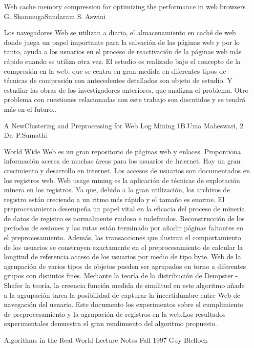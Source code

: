 Web cache memory compression for optimizing the performance in web browsers
G. ShanmugaSundaram
S. Aswini

Los navegadores Web se utilizan a diario, el almacenamiento en caché de web donde juega un papel importante para la salvación de las páginas web y por lo tanto, ayuda a los usuarios en el proceso de reactivación de la páginas web más rápido cuando se utiliza otra vez. El estudio es realizado bajo el concepto de la compresión en la web, que se centra en gran medida en diferentes tipos de técnicas de compresión con antecedentes detallados son objeto de estudio. Y estudiar las obras de los investigadores anteriores, que analizan el problema.  Otro problema con cuestiones relacionadas con este trabajo son discutidos y se tendrá más en el futuro..


A NewClustering and Preprocessing for Web Log Mining
1B.Uma Maheswari, 2 Dr. P.Sumathi

World Wide Web es un gran repositorio de páginas web y enlaces. Proporciona información acerca de muchas áreas para los usuarios de Internet. Hay un gran crecimiento y desarrollo en internet. Los accesos de usuarios  son documentados en los registros web. Web usage mining es la aplicación de técnicas de explotación minera en los registros. Ya que, debido a la gran utilización, los archivos de registro están creciendo a un ritmo más rápido y el tamaño es enorme. El preprocesamiento desempeña un papel vital en la eficacia del proceso de minería de datos de registro es normalmente ruidoso e indefinidos. Reconstrucción de los períodos de sesiones y las rutas están terminado por añadir páginas faltantes en el preprocesamiento. Además, las transacciones que ilustran el comportamiento de los usuarios se construyen exactamente en el preprocesamiento de calcular la longitud de referencia acceso de los usuarios por medio de tipo byte. Web de la agrupación de varios tipos de objetos pueden ser agrupados en torno a diferentes grupos con distintos fines. Mediante la teoría de la distribución de Dempster - Shafer la teoría, la creencia función medida de similitud en este algoritmo añade a la agrupación tarea la posibilidad de capturar la incertidumbre entre Web de navegación del usuario. Este documento los experimentos sobre el cumplimiento de preprocesamiento y la agrupación de registros en la web.Los resultados experimentales demuestra el gran rendimiento del algoritmo propuesto.


Algorithms in the Real World Lecture Notes Fall 1997
Guy Blelloch

